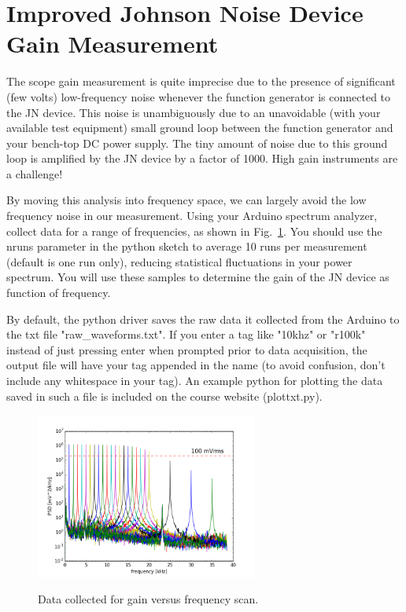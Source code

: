 \documentclass[12pt]{article}
\begin{document}
\section{Improved Johnson Noise Device Gain Measurement}

The scope gain measurement is quite imprecise due to the presence of significant (few volts) low-frequency noise whenever the function generator is connected to the JN device.  This noise is unambiguously due to an unavoidable (with your available test equipment) small ground loop between the function generator and your bench-top DC power supply.  The tiny amount of noise due to this ground loop is amplified by the JN device by a factor of 1000.  High gain instruments are a challenge!  

By moving this analysis into frequency space, we can largely avoid the low frequency noise in our measurement.  Using your Arduino spectrum analyzer, collect data for a range of frequencies, as shown in Fig.~\ref{fig:gain_raw}.  You should use the nruns parameter in the python sketch to average 10 runs per measurement (default is one run only), reducing statistical fluctuations in your power spectrum.  You will use these samples to determine the gain of the JN device as function of frequency.  

By default, the python driver saves the raw data it collected from the Arduino to the txt file "raw\_waveforms.txt".   If you enter a tag like "10khz" or "r100k" instead of just pressing enter when prompted prior to data acquisition, the output file will have your tag appended in the name (to avoid confusion, don't include any whitespace in your tag).  An example python for plotting the data saved in such a file is included on the course website (plottxt.py). 

\begin{figure}[htbp]
\begin{center}
{\includegraphics[width=0.65\textwidth]{figs/gain_raw.png}}
\end{center}
\caption{\label{fig:gain_raw}  Data collected for gain versus frequency scan.}\end{figure}
\end{document}
